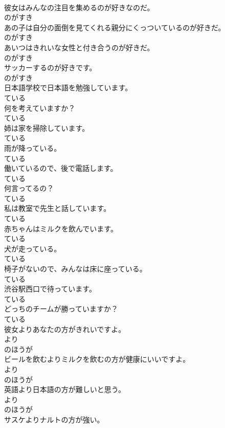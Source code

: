 \documentclass[8pt]{extreport}
\begin{document}
\begin{CJK}{UTF8}{min}
\\	彼女はみんなの注目を集めるのが好きなのだ。	
\\	のがすき
\\	あの子は自分の面倒を見てくれる親分にくっついているのが好きだ。	
\\	のがすき
\\	あいつはきれいな女性と付き合うのが好きだ。	
\\	のがすき
\\	サッカーするのが好きです。	
\\	のがすき
\\	日本語学校で日本語を勉強しています。	
\\	ている
\\	何を考えていますか？	
\\	ている
\\	姉は家を掃除しています。	
\\	ている
\\	雨が降っている。	
\\	ている
\\	働いているので、後で電話します。	
\\	ている
\\	何言ってるの？	
\\	ている
\\	私は教室で先生と話しています。	
\\	ている
\\	赤ちゃんはミルクを飲んでいます。	
\\	ている
\\	犬が走っている。	
\\	ている
\\	椅子がないので、みんなは床に座っている。	
\\	ている
\\	渋谷駅西口で待っています。	
\\	ている
\\	どっちのチームが勝っていますか？	
\\	ている
\\	彼女よりあなたの方がきれいですよ。	
\\	より 
\\	のほうが 
\\	ビールを飲むよりミルクを飲むの方が健康にいいですよ。	
\\	より 
\\	のほうが 
\\	英語より日本語の方が難しいと思う。	
\\	より 
\\	のほうが 
\\	サスケよりナルトの方が強い。	

\end{CJK}
\end{document}
